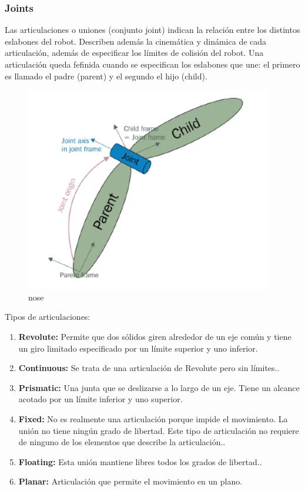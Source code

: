         \subsubsection{Joints}
        
        Las articulaciones o uniones (conjunto joint) indican la relación entre los distintos eslabones del robot. Describen además la cinemática y dinámica de cada articulación, además de especificar los límites de colisión del robot. Una articulación queda fefinida cuando se especifican los eslabones que une: el primero es llamado el padre (parent) y el segundo el hijo (child).
        
        \begin{figure}[htb]
            \centering
            \includegraphics[width=0.65\linewidth]{Main/Chapter3/Images3/3-8/representacion-de-una-articulacion-en-URDF.png}
            \caption{nose}
            \label{f:Cap3-8_nose_nose}
        \end{figure} 
        
        Tipos de articulaciones:
        
        \begin{enumerate}
           \item \textbf{Revolute:} Permite que dos sólidos giren alrededor de un eje común y tiene un giro limitado especificado por un límite superior y uno inferior.
            \item \textbf{Continuous:} Se trata de una articulación de Revolute pero sin límites..
            \item \textbf{Prismatic:} Una junta que se deslizarse a lo largo de un eje. Tiene un alcance acotado por un límite inferior y uno superior.
            \item \textbf{Fixed:} No es realmente una articulación porque impide el movimiento. La unión no tiene ningún grado de libertad. Este tipo de articulación no requiere de ninguno de los elementos que describe la articulación..
            \item \textbf{Floating:} Esta unión mantiene libres todos los grados de libertad..
            \item \textbf{Planar:} Articulación que permite el movimiento en un plano.
        \end{enumerate}
        
